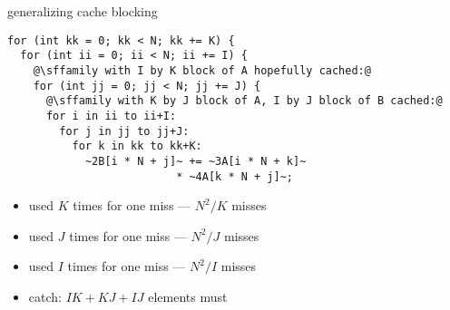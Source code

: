 \begin{frame}[fragile,label=cacheBlockExample]{generalizing cache blocking}
\vspace{-.25cm}
\begin{lstlisting}
for (int kk = 0; kk < N; kk += K) {
  for (int ii = 0; ii < N; ii += I) {
    @\sffamily with I by K block of A hopefully cached:@
    for (int jj = 0; jj < N; jj += J) {
      @\sffamily with K by J block of A, I by J block of B cached:@
      for i in ii to ii+I:
        for j in jj to jj+J:
          for k in kk to kk+K:
            ~2B[i * N + j]~ += ~3A[i * N + k]~
                          * ~4A[k * N + j]~;
\end{lstlisting}
\begin{itemize}
    \item {} used $K$ times for one miss --- $N^2/K$ misses
    \item {} used $J$ times for one miss --- $N^2/J$ misses
    \item {} used $I$ times for one miss --- $N^2/I$ misses
\item catch: $IK+KJ+IJ$ elements must 
\end{itemize}
\end{frame}
